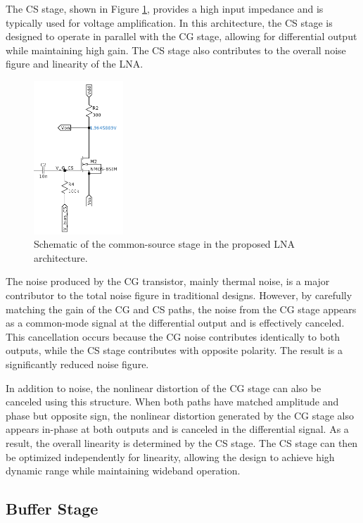 The CS stage, shown in Figure \ref{fig:schem-cs}, provides a high input impedance and is typically used for voltage amplification. In this architecture, the CS stage is designed to operate in parallel with the CG stage, allowing for differential output while maintaining high gain. The CS stage also contributes to the overall noise figure and linearity of the LNA.

\begin{figure}[H]
    \centering
    \includegraphics[width=0.3\textwidth]{Images/schem-CS.png}
    \caption{Schematic of the common-source stage in the proposed LNA architecture.}
    \label{fig:schem-cs}
\end{figure}

The noise produced by the CG transistor, mainly thermal noise, is a major contributor to the total noise figure in traditional designs. However, by carefully matching the gain of the CG and CS paths, the noise from the CG stage appears as a common-mode signal at the differential output and is effectively canceled. This cancellation occurs because the CG noise contributes identically to both outputs, while the CS stage contributes with opposite polarity. The result is a significantly reduced noise figure.

In addition to noise, the nonlinear distortion of the CG stage can also be canceled using this structure. When both paths have matched amplitude and phase but opposite sign, the nonlinear distortion generated by the CG stage also appears in-phase at both outputs and is canceled in the differential signal. As a result, the overall linearity is determined by the CS stage. The CS stage can then be optimized independently for linearity, allowing the design to achieve high dynamic range while maintaining wideband operation.

\subsection{Buffer Stage}

